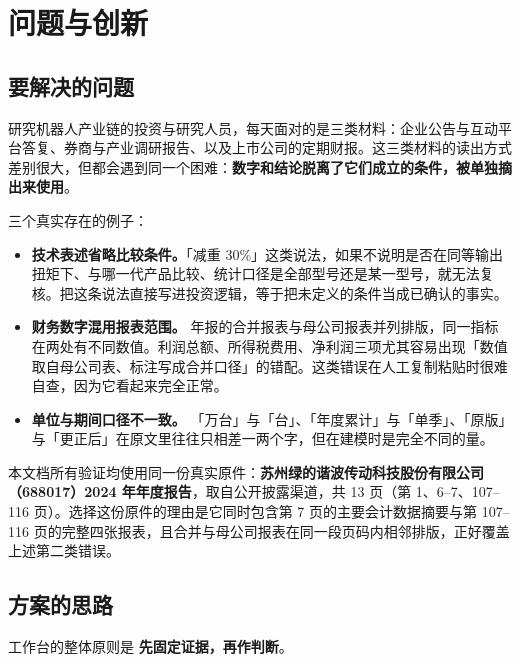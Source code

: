 \documentclass[11pt,a4paper]{ctexart}
\newcommand{\kw}[1]{\textcolor{accent}{\bfseries #1}}
\begin{document}
\clearpage

\section{问题与创新}

\subsection{要解决的问题}

研究机器人产业链的投资与研究人员，每天面对的是三类材料：企业公告与互动平台答复、券商与产业调研报告、以及上市公司的定期财报。这三类材料的读出方式差别很大，但都会遇到同一个困难：\kw{数字和结论脱离了它们成立的条件，被单独摘出来使用}。

三个真实存在的例子：

\begin{itemize}
  \item \textbf{技术表述省略比较条件。}「减重 30\%」这类说法，如果不说明是否在同等输出扭矩下、与哪一代产品比较、统计口径是全部型号还是某一型号，就无法复核。把这条说法直接写进投资逻辑，等于把未定义的条件当成已确认的事实。
  \item \textbf{财务数字混用报表范围。} 年报的合并报表与母公司报表并列排版，同一指标在两处有不同数值。利润总额、所得税费用、净利润三项尤其容易出现「数值取自母公司表、标注写成合并口径」的错配。这类错误在人工复制粘贴时很难自查，因为它看起来完全正常。
  \item \textbf{单位与期间口径不一致。} 「万台」与「台」、「年度累计」与「单季」、「原版」与「更正后」在原文里往往只相差一两个字，但在建模时是完全不同的量。
\end{itemize}

\begin{note}[案例背景]
本文档所有验证均使用同一份真实原件：\textbf{苏州绿的谐波传动科技股份有限公司（688017）2024 年年度报告}，取自公开披露渠道，共 13 页（第 1、6--7、107--116 页）。选择这份原件的理由是它同时包含第 7 页的主要会计数据摘要与第 107--116 页的完整四张报表，且合并与母公司报表在同一段页码内相邻排版，正好覆盖上述第二类错误。
\end{note}

\subsection{方案的思路}

工作台的整体原则是 \kw{先固定证据，再作判断}。
\end{document}
